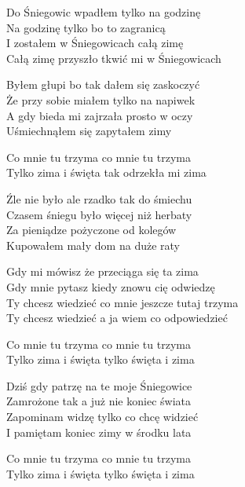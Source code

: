 \begin{text}
    Do Śniegowic wpadłem tylko na godzinę\\
    Na godzinę tylko bo to zagranicą\\
    I zostałem w Śniegowicach całą zimę\\
    Całą zimę przyszło tkwić mi w Śniegowicach

    Byłem głupi bo tak dałem się zaskoczyć\\
    Że przy sobie miałem tylko na napiwek\\
    A gdy bieda mi zajrzała prosto w oczy\\
    Uśmiechnąłem się zapytałem zimy

    Co mnie tu trzyma co mnie tu trzyma\\
    Tylko zima i święta tak odrzekła mi zima

    Źle nie było ale rzadko tak do śmiechu\\
    Czasem śniegu było więcej niż herbaty\\
    Za pieniądze pożyczone od kolegów\\
    Kupowałem mały dom na duże raty

    Gdy mi mówisz że przeciąga się ta zima\\
    Gdy mnie pytasz kiedy znowu cię odwiedzę\\
    Ty chcesz wiedzieć co mnie jeszcze tutaj trzyma\\
    Ty chcesz wiedzieć a ja wiem co odpowiedzieć

    Co mnie tu trzyma co mnie tu trzyma\\
    Tylko zima i święta tylko święta i zima

    Dziś gdy patrzę na te moje Śniegowice\\
    Zamrożone tak a już nie koniec świata\\
    Zapominam widzę tylko co chcę widzieć\\
    I pamiętam koniec zimy w środku lata

    Co mnie tu trzyma co mnie tu trzyma\\
    Tylko zima i święta tylko święta i zima
\end{text}
